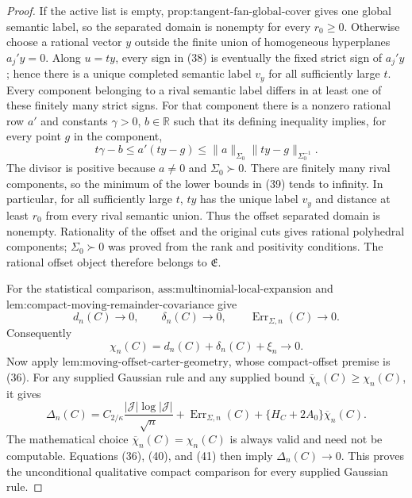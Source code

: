 \documentclass{article}
\begin{document}
\begin{proof}
If the active list is empty, \(\text{prop:tangent-fan-global-cover}\) gives one global semantic label, so the separated domain is nonempty for every \(r_0\ge0\).  Otherwise choose a rational vector \(y\) outside the finite union of homogeneous hyperplanes \(a_j'y=0\).  Along \(u=ty\), every sign in (38) is eventually the fixed strict sign of \(a_j'y\); hence there is a unique completed semantic label \(v_y\) for all sufficiently large \(t\).  Every component belonging to a rival semantic label differs in at least one of these finitely many strict signs.  For that component there is a nonzero rational row \(a'\) and constants \(\gamma>0\), \(b\in\mathbb R\) such that its defining inequality implies, for every point \(g\) in the component,
\[
 t\gamma-b\le a'(ty-g)
 \le \|a\|_{\Sigma_0}\|ty-g\|_{\Sigma_0^{-1}}.
 \tag{39}
\]
The divisor is positive because \(a\ne0\) and \(\Sigma_0\succ0\).  There are finitely many rival components, so the minimum of the lower bounds in (39) tends to infinity.  In particular, for all sufficiently large \(t\), \(ty\) has the unique label \(v_y\) and distance at least \(r_0\) from every rival semantic union.  Thus the offset separated domain is nonempty.  Rationality of the offset and the original cuts gives rational polyhedral components; \(\Sigma_0\succ0\) was proved from the rank and positivity conditions.  The rational offset object therefore belongs to \(\mathfrak E\).

For the statistical comparison, \(\text{ass:multinomial-local-expansion}\) and \(\text{lem:compact-moving-remainder-covariance}\) give
\[
 d_n(C)\to0,
 \qquad \delta_n(C)\to0,
 \qquad \operatorname{Err}_{\Sigma,n}(C)\to0.
 \tag{40}
\]
Consequently
\[
 \chi_n(C)=d_n(C)+\delta_n(C)+\xi_n\longrightarrow0.
 \tag{41}
\]
Now apply \(\text{lem:moving-offset-carter-geometry}\), whose compact-offset premise is (36).  For any supplied Gaussian rule and any supplied bound \(\overline\chi_n(C)\ge\chi_n(C)\), it gives
\[
 \Delta_n(C)=C_{2/\kappa}\frac{|\mathcal J|\log|\mathcal J|}{\sqrt n}
 +\operatorname{Err}_{\Sigma,n}(C)
 +\{H_C+2A_0\}\overline\chi_n(C).
 \tag{42}
\]
The mathematical choice \(\overline\chi_n(C)=\chi_n(C)\) is always valid and need not be computable.  Equations (36), (40), and (41) then imply \(\Delta_n(C)\to0\).  This proves the unconditional qualitative compact comparison for every supplied Gaussian rule.


\end{proof}
\end{document}
